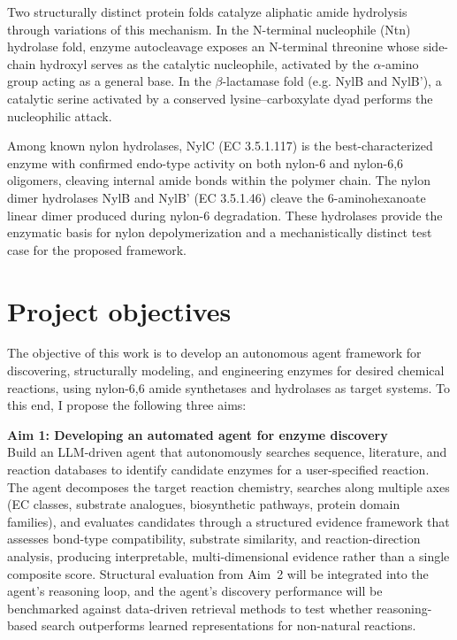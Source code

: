 \documentclass[12pt]{article}
\begin{document}
Two structurally distinct protein folds catalyze aliphatic amide hydrolysis through variations of this mechanism. In the N-terminal nucleophile (Ntn) hydrolase fold, enzyme autocleavage exposes an N-terminal threonine whose side-chain hydroxyl serves as the catalytic nucleophile, activated by the $\alpha$-amino group acting as a general base\cite{negoro2012nylon}. In the $\beta$-lactamase fold (e.g. NylB and NylB'), a catalytic serine activated by a conserved lysine–carboxylate dyad performs the nucleophilic attack\cite{negoro2005three}.

Among known nylon hydrolases, NylC (EC 3.5.1.117) is the best-characterized enzyme with confirmed endo-type activity on both nylon-6 and nylon-6,6 oligomers, cleaving internal amide bonds within the polymer chain\cite{negoro2012nylon}. The nylon dimer hydrolases NylB and NylB' (EC 3.5.1.46) cleave the 6-aminohexanoate linear dimer produced during nylon-6 degradation. These hydrolases provide the enzymatic basis for nylon depolymerization and a mechanistically distinct test case for the proposed framework.


\section{Project objectives}
\label{sec:ProjectObjectives}
The objective of this work is to develop an autonomous agent framework for discovering, structurally modeling, and engineering enzymes for desired chemical reactions, using nylon-6,6 amide synthetases and hydrolases as target systems. To this end, I propose the following three aims:

\textbf{Aim 1: Developing an automated agent for enzyme discovery} \\
Build an LLM-driven agent that autonomously searches sequence, literature, and reaction databases to identify candidate enzymes for a user-specified reaction. The agent decomposes the target reaction chemistry, searches along multiple axes (EC classes, substrate analogues, biosynthetic pathways, protein domain families), and evaluates candidates through a structured evidence framework that assesses bond-type compatibility, substrate similarity, and reaction-direction analysis, producing interpretable, multi-dimensional evidence rather than a single composite score. Structural evaluation from Aim~2 will be integrated into the agent's reasoning loop, and the agent's discovery performance will be benchmarked against data-driven retrieval methods to test whether reasoning-based search outperforms learned representations for non-natural reactions.
\end{document}
